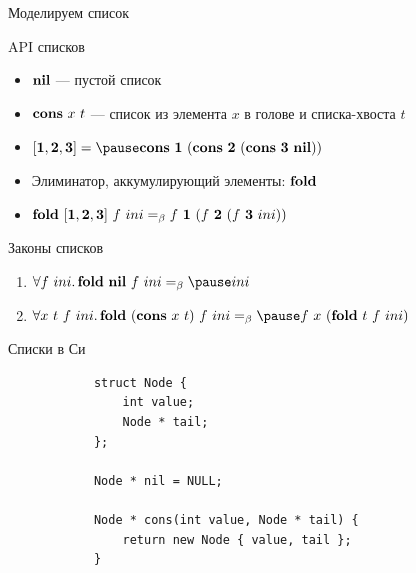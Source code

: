     \begin{frame}[fragile]{Моделируем список}
        \pause
        \begin{block}{API списков}
            \begin{itemize}
                \item $\mathbf{nil}$ --- пустой список
                \item $\mathbf{cons} ~ x ~ t$ --- список из элемента $x$ в голове и списка-хвоста $t$
                \item[\eg] $\tlist{\term{1}, \term{2}, \term{3}} \eqt \pause \term{cons} \ap \term{1} \ap (\term{cons} \ap \term{2} \ap (\term{cons} \ap \term{3} \ap \term{nil}))$
                \item Элиминатор, аккумулирующий элементы: $\mathbf{fold}$
                \item[\eg] $\mathbf{fold} ~ \mathbf{[}\mathbf{1}, \mathbf{2}, \mathbf{3}\mathbf{]} ~ f ~ ini =_\beta f ~ \mathbf{1} ~ (f ~ \mathbf{2} ~ (f ~ \mathbf{3} ~ ini))$
            \end{itemize}
        \end{block}
        \pause
        \begin{block}{Законы списков}
            \begin{enumerate}
                \item \pause $\forall f~ini\ldotp \term{fold} \ap \term{nil} \ap f \ap ini \eqbeta \pause ini$
                \item \pause $\forall x~t~f~ini\ldotp \term{fold} \ap (\term{cons} \ap x \ap t) \ap f \ap ini \eqbeta \pause f \ap x \ap (\term{fold} \ap t \ap f \ap ini)$
            \end{enumerate}
        \end{block}
    \end{frame}

    \begin{frame}[fragile]{Списки в Си \popslide}
        \begin{verbatim}
            struct Node {
                int value;
                Node * tail;
            };

            Node * nil = NULL;

            Node * cons(int value, Node * tail) {
                return new Node { value, tail };
            }
        \end{verbatim}
    \end{frame}

